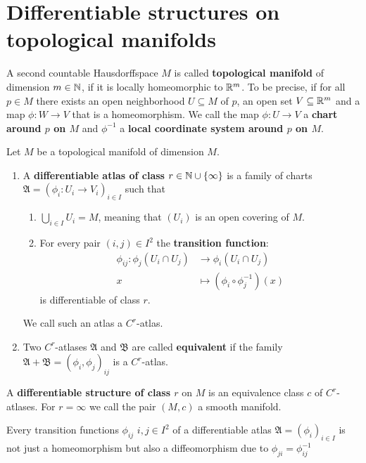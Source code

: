 \section{Differentiable structures on topological manifolds}
\begin{definition}
    A second countable Hausdorffspace $M$ is called \textbf{topological manifold} of dimension $m\in \mathbb{N}$, if it is locally homeomorphic to $\mathbb{R}^m$. To be precise, if for all $p\in M$ there exists an open neighborhood $U\subseteq M$ of $p$, an open set $V\subseteq \mathbb{R}^m$  and a map $\phi:W\to V$ that is a homeomorphism. We call the map $\phi:U\to V$ a \textbf{chart around $p$ on $M$} and $\phi^{-1}$ a \textbf{local coordinate system around $p$ on $M$}.
\end{definition}
\begin{definition}
Let $M$ be a topological manifold of dimension $M$. 
\begin{enumerate}
    \item A \textbf{differentiable atlas of class } $r\in \mathbb{N}\cup\{\infty\}$ is a family of charts $\mathfrak{A}=\left( \phi_i:U_i \to V_i\right)_{i\in I}$ such that
    \begin{enumerate}
        \item $\bigcup_{i\in I}U_i=M$, meaning that $\left( U_i\right)$ is an open covering of $M$.
        \item For every pair $(i,j)\in I^2$ the \textbf{transition function}:
        \begin{align*}
             \phi_{ij}:\phi_j(U_i \cap U_j)&\to \phi_i(U_i \cap U_j)\\
             x                             &\mapsto \left(\phi_i \circ \phi_j^{-1}\right)(x)
             \end{align*}
             is differentiable of class $r$.
    \end{enumerate}
    We call such an atlas a $C^r$-atlas.
    \item Two $C^r$-atlases $\mathfrak{A}$ and $\mathfrak{B}$ are called \textbf{equivalent} if the family $\mathfrak{A}+\mathfrak{B}=\left(\phi_i,\phi_j\right)_{ij}$ is a $C^r$-atlas.
\end{enumerate}
A \textbf{differentiable structure of class $r$} on $M$ is an equivalence class $c$ of $C^r$-atlases. 
For $r=\infty$ we call the pair $(M,c)$ a smooth manifold.
\end{definition}
\begin{corollary}
    Every transition functions $\phi_{ij}$ $i,j\in I^2$ of a differentiable atlas $\mathfrak{A}=(\phi_i)_{i\in I}$ is not just a homeomorphism but also a diffeomorphism due to $\phi_{ji}=\phi_{ij}^{-1}$ 
\end{corollary}

